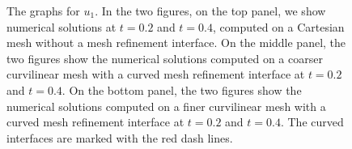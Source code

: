 \begin{figure}[htbp]
\caption{The graphs for $u_1$. In the two figures, on the top panel, we show numerical solutions at $t=0.2$ and $t=0.4$, computed on a Cartesian mesh without a mesh refinement interface. On the middle panel, the two figures show the numerical solutions computed on a coarser curvilinear mesh with a curved mesh refinement interface at $t=0.2$ and $t=0.4$. On the bottom panel, the two figures show the numerical solutions computed on a finer curvilinear mesh with a curved mesh refinement interface at $t=0.2$ and $t=0.4$. The curved interfaces are marked with the red dash lines.}
\label{u1}
\end{figure}


